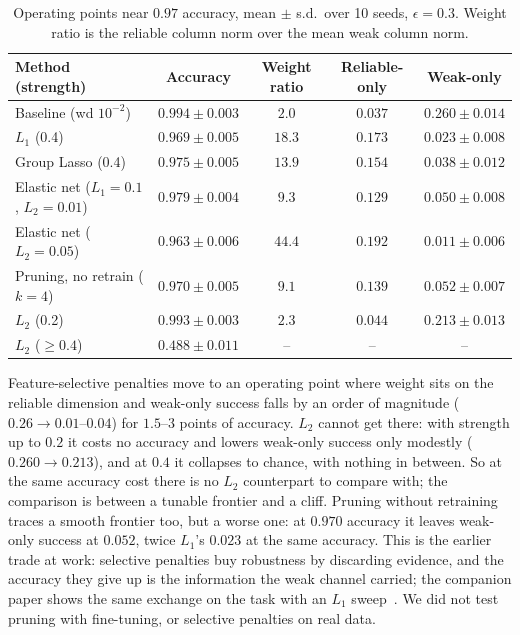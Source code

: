 \documentclass[11pt]{article}
\begin{document}
\begin{table}[h]
\centering
\caption{Operating points near $0.97$ accuracy, mean $\pm$ s.d.\ over 10 seeds, $\epsilon=0.3$.
Weight ratio is the reliable column norm over the mean weak column norm.}
\label{tab:reg}
\begin{tabular}{lcccc}
\toprule
Method (strength) & Accuracy & Weight ratio & Reliable-only & Weak-only\\
\midrule
Baseline (wd $10^{-2}$) & $0.994\pm0.003$ & $2.0$ & $0.037$ & $0.260\pm0.014$\\
$L_1$ (0.4) & $0.969\pm0.005$ & $18.3$ & $0.173$ & $0.023\pm0.008$\\
Group Lasso (0.4) & $0.975\pm0.005$ & $13.9$ & $0.154$ & $0.038\pm0.012$\\
Elastic net ($L_1{=}0.1$, $L_2{=}0.01$) & $0.979\pm0.004$ & $9.3$ & $0.129$ & $0.050\pm0.008$\\
Elastic net ($L_2{=}0.05$) & $0.963\pm0.006$ & $44.4$ & $0.192$ & $0.011\pm0.006$\\
Pruning, no retrain ($k{=}4$) & $0.970\pm0.005$ & $9.1$ & $0.139$ & $0.052\pm0.007$\\
$L_2$ (0.2) & $0.993\pm0.003$ & $2.3$ & $0.044$ & $0.213\pm0.013$\\
$L_2$ ($\ge0.4$) & $0.488\pm0.011$ & -- & -- & --\\
\bottomrule
\end{tabular}
\end{table}

Feature-selective penalties move to an operating point where weight sits on the reliable
dimension and weak-only success falls by an order of magnitude ($0.26\to0.01$--$0.04$) for $1.5$--$3$ points of accuracy.
$L_2$ cannot get there: with strength up to $0.2$ it costs no accuracy and lowers weak-only success only
modestly ($0.260\to0.213$), and at $0.4$ it collapses to chance, with nothing in between. So at the same accuracy
cost there is no $L_2$ counterpart to compare with; the comparison is between a tunable frontier
and a cliff. Pruning without retraining traces a smooth frontier too, but a worse one: at $0.970$ accuracy it leaves
weak-only success at $0.052$, twice $L_1$'s $0.023$ at the same accuracy. This is the earlier trade at work: selective
penalties buy robustness by discarding evidence, and the accuracy they give up is the information the weak channel carried;
the companion paper shows the same exchange on the task with an $L_1$ sweep~\cite{rootcause}. We did not test pruning with
fine-tuning, or selective penalties on real data.
\end{document}

